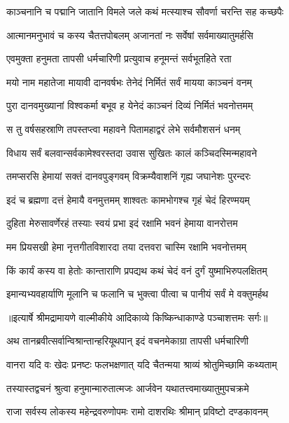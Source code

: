 \twolineshloka
{काञ्चनानि च पद्मानि जातानि विमले जले}
{कथं मत्स्याश्च सौवर्णा चरन्ति सह कच्छपैः} %

\twolineshloka
{आत्मानमनुभावं च कस्य चैतत्तपोबलम्}
{अजानतां नः सर्वेषां सर्वमाख्यातुमर्हसि} %

\twolineshloka
{एवमुक्ता हनुमता तापसी धर्मचारिणी}
{प्रत्युवाच हनूमन्तं सर्वभूतहिते रता} %

\twolineshloka
{मयो नाम महातेजा मायावी दानवर्षभः}
{तेनेदं निर्मितं सर्वं मायया काञ्चनं वनम्} %

\twolineshloka
{पुरा दानवमुख्यानां विश्वकर्मा बभूव ह}
{येनेदं काञ्चनं दिव्यं निर्मितं भवनोत्तमम्} %

\twolineshloka
{स तु वर्षसहस्राणि तपस्तप्त्वा महावने}
{पितामहाद्वरं लेभे सर्वमौशसनं धनम्} %

\twolineshloka
{विधाय सर्वं बलवान्सर्वकामेश्वरस्तदा}
{उवास सुखितः कालं कञ्चिदस्मिन्महावने} %

\twolineshloka
{तमप्सरसि हेमायां सक्तं दानवपुङ्गवम्}
{विक्रम्यैवाशनिं गृह्य जघानेशः पुरन्दरः} %

\twolineshloka
{इदं च ब्रह्मणा दत्तं हेमायै वनमुत्तमम्}
{शाश्वतः कामभोगश्च गृहं चेदं हिरण्मयम्} %

\twolineshloka
{दुहिता मेरुसावर्णेरहं तस्याः स्वयं प्रभा}
{इदं रक्षामि भवनं हेमाया वानरोत्तम} %

\twolineshloka
{मम प्रियसखी हेमा नृत्तगीतविशारदा}
{तया दत्तवरा चास्मि रक्षामि भवनोत्तमम्} %

\twolineshloka
{किं कार्यं कस्य वा हेतोः कान्ताराणि प्रपद्यथ}
{कथं चेदं वनं दुर्गं युष्माभिरुपलक्षितम्} %

\twolineshloka
{इमान्यभ्यवहार्याणि मूलानि च फलानि च}
{भुक्त्वा पीत्वा च पानीयं सर्वं मे वक्तुमर्हथ} %


{॥इत्यार्षे श्रीमद्रामायणे वाल्मीकीये आदिकाव्ये किष्किन्धाकाण्डे पञ्चाशत्तमः सर्गः॥}


\twolineshloka
{अथ तानब्रवीत्सर्वान्विश्रान्तान्हरियूथपान्}
{इदं वचनमेकाग्रा तापसी धर्मचारिणी} %

\twolineshloka
{वानरा यदि वः खेदः प्रनष्टः फलभक्षणात्}
{यदि चैतन्मया श्राव्यं श्रोतुमिच्छामि कथ्यताम्} %

\twolineshloka
{तस्यास्तद्वचनं श्रुत्वा हनुमान्मारुतात्मजः}
{आर्जवेन यथातत्त्वमाख्यातुमुपचक्रमे} %

\twolineshloka
{राजा सर्वस्य लोकस्य महेन्द्रवरुणोपमः}
{रामो दाशरथिः श्रीमान् प्रविष्टो दण्डकावनम्} %

